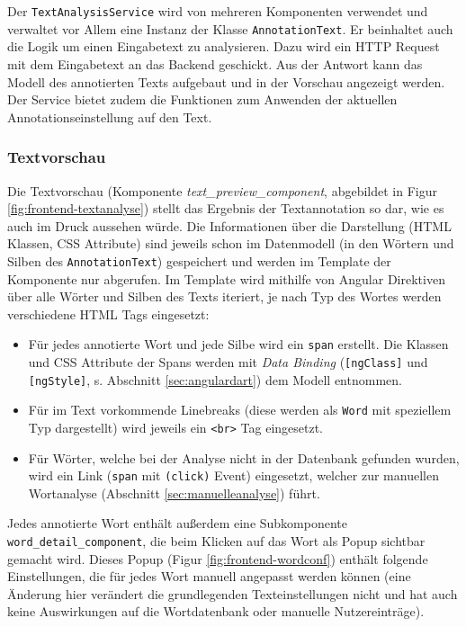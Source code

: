 Der \texttt{TextAnalysisService} wird von mehreren Komponenten verwendet und verwaltet vor Allem eine Instanz der Klasse \texttt{AnnotationText}. Er beinhaltet auch die Logik um einen Eingabetext zu analysieren. Dazu wird ein HTTP Request mit dem Eingabetext an das Backend geschickt. Aus der Antwort kann das Modell des annotierten Texts aufgebaut und in der Vorschau angezeigt werden. Der Service bietet zudem die Funktionen zum Anwenden der aktuellen Annotationseinstellung auf den Text.

\subsubsection{Textvorschau}

Die Textvorschau (Komponente \textit{text\_preview\_component}, abgebildet in Figur \ref{fig:frontend-textanalyse}) stellt das Ergebnis der Textannotation so dar, wie es auch im Druck aussehen würde. Die Informationen über die Darstellung (HTML Klassen, CSS Attribute) sind jeweils schon im Datenmodell (in den Wörtern und Silben des \texttt{AnnotationText}) gespeichert und werden im Template der Komponente nur abgerufen. Im Template wird mithilfe von Angular Direktiven über alle Wörter und Silben des Texts iteriert, je nach Typ des Wortes werden verschiedene HTML Tags eingesetzt:
\begin{itemize}
	\item Für jedes annotierte Wort und jede Silbe wird ein \texttt{span} erstellt. Die Klassen und CSS Attribute der  Spans werden mit \textit{Data Binding} (\texttt{[ngClass]} und \texttt{[ngStyle]}, s. Abschnitt \ref{sec:angulardart}) dem Modell entnommen.
	
	\item Für im Text vorkommende Linebreaks (diese werden als \texttt{Word} mit speziellem Typ dargestellt) wird jeweils ein \texttt{<br>} Tag eingesetzt.
	
	\item Für Wörter, welche bei der Analyse nicht in der Datenbank gefunden wurden, wird ein Link (\texttt{span} mit \texttt{(click)} Event) eingesetzt, welcher zur manuellen Wortanalyse (Abschnitt \ref{sec:manuelleanalyse}) führt.
\end{itemize}

Jedes annotierte Wort enthält außerdem eine Subkomponente \texttt{word\_detail\_component}, die beim Klicken auf das Wort als Popup sichtbar gemacht wird. Dieses Popup (Figur \ref{fig:frontend-wordconf}) enthält folgende Einstellungen, die für jedes Wort manuell angepasst werden können (eine Änderung hier verändert die grundlegenden Texteinstellungen nicht und hat auch keine Auswirkungen auf die Wortdatenbank oder manuelle Nutzereinträge).

